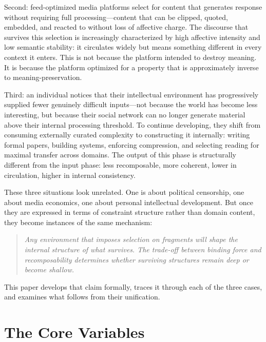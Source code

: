 \documentclass[12pt]{article}
\begin{document}
Second: feed-optimized media platforms select for content that generates
response without requiring full processing—content that can be clipped,
quoted, embedded, and reacted to without loss of affective charge. The
discourse that survives this selection is increasingly characterized by high
affective intensity and low semantic stability: it circulates widely but means
something different in every context it enters. This is not because the
platform intended to destroy meaning. It is because the platform optimized
for a property that is approximately inverse to meaning-preservation.

Third: an individual notices that their intellectual environment has progressively
supplied fewer genuinely difficult inputs—not because the world has become
less interesting, but because their social network can no longer generate
material above their internal processing threshold. To continue developing,
they shift from consuming externally curated complexity to constructing it
internally: writing formal papers, building systems, enforcing compression,
and selecting reading for maximal transfer across domains. The output of this
phase is structurally different from the input phase: less recomposable, more
coherent, lower in circulation, higher in internal consistency.

These three situations look unrelated. One is about political censorship, one
about media economics, one about personal intellectual development. But
once they are expressed in terms of constraint structure rather than domain
content, they become instances of the same mechanism:

\begin{quote}
\emph{Any environment that imposes selection on fragments will shape the
internal structure of what survives. The trade-off between binding force and
recomposability determines whether surviving structures remain deep or
become shallow.}
\end{quote}

This paper develops that claim formally, traces it through each of the three
cases, and examines what follows from their unification.

\section{The Core Variables}
\label{sec:variables}
\end{document}
